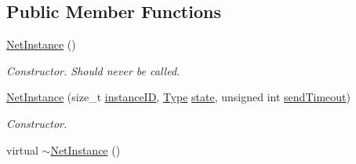 \subsection*{Public Member Functions}
\begin{DoxyCompactItemize}
\item 
\hyperlink{class_net_instance_af7c6a53e6ccd04338e5628b2702f75ac}{NetInstance} ()
\begin{DoxyCompactList}\small\item\em Constructor. Should never be called. \item\end{DoxyCompactList}\item 
\hyperlink{class_net_instance_ac95a2590fab6438ffdc3c704b47dd147}{NetInstance} (size\_\-t \hyperlink{class_net_instance_a46bab6fc672f987ee3c52daabffe34f7}{instanceID}, \hyperlink{class_net_instance_a0ec01a76d9b78794cfbdeab10a436cdc}{Type} \hyperlink{class_net_instance_a8eda1eb1e030ca5edfc292d97b8efbed}{state}, unsigned int \hyperlink{class_net_instance_a39ed2f4325ce50a7c374ab6253650608}{sendTimeout})
\begin{DoxyCompactList}\small\item\em Constructor. \item\end{DoxyCompactList}\item 
\hypertarget{class_net_instance_ae0e36e0e07d6b1f8dac7fa9acf3a3af4}{
virtual \hyperlink{class_net_instance_ae0e36e0e07d6b1f8dac7fa9acf3a3af4}{$\sim$NetInstance} ()}
\label{class_net_instance_ae0e36e0e07d6b1f8dac7fa9acf3a3af4}


\end{DoxyCompactItemize}
